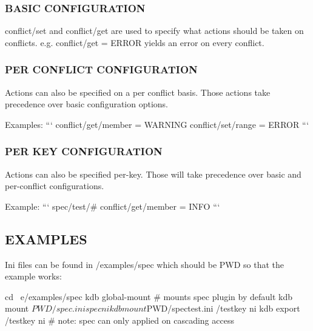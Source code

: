 \subsubsection*{B\+A\+S\+I\+C C\+O\+N\+F\+I\+G\+U\+R\+A\+T\+I\+O\+N}

{\ttfamily conflict/set} and {\ttfamily conflict/get} are used to specify what actions should be taken on conflicts. e.\+g. {\ttfamily conflict/get = E\+R\+R\+O\+R} yields an error on every conflict.

\subsubsection*{P\+E\+R C\+O\+N\+F\+L\+I\+C\+T C\+O\+N\+F\+I\+G\+U\+R\+A\+T\+I\+O\+N}

Actions can also be specified on a per conflict basis. Those actions take precedence over basic configuration options.

Examples\+: ``` conflict/get/member = W\+A\+R\+N\+I\+N\+G conflict/set/range = E\+R\+R\+O\+R ```

\subsubsection*{P\+E\+R K\+E\+Y C\+O\+N\+F\+I\+G\+U\+R\+A\+T\+I\+O\+N}

Actions can also be specified per-\/key. Those will take precedence over basic and per-\/conflict configurations.

Example\+: ``` spec/test/\# conflict/get/member = I\+N\+F\+O ```

\subsection*{E\+X\+A\+M\+P\+L\+E\+S}

Ini files can be found in /examples/spec which should be P\+W\+D so that the example works\+: \begin{DoxyVerb}    cd ~e/examples/spec
    kdb global-mount        # mounts spec plugin by default
    kdb mount $PWD/spec.ini spec ni
    kdb mount $PWD/spectest.ini /testkey ni
    kdb export /testkey ni     # note: spec can only applied on cascading access
\end{DoxyVerb}


